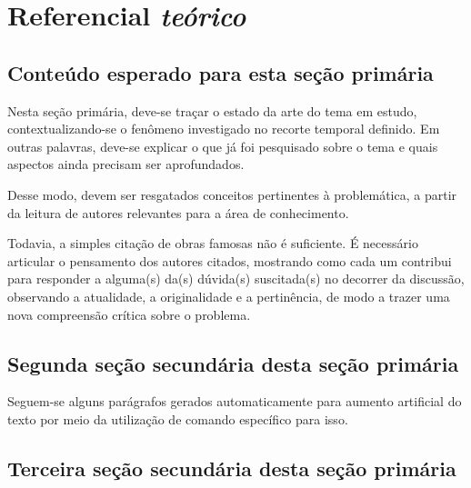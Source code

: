 \chapter{Referencial \normalfont \bfseries \itshape teórico}\label{sec-refteo} %
\section{Conteúdo esperado para esta seção primária}
Nesta seção primária, deve-se traçar o estado da arte do tema em estudo, contextualizando-se o fenômeno investigado no recorte temporal definido. Em outras palavras, deve-se explicar o que já foi pesquisado sobre o tema e quais aspectos ainda precisam ser aprofundados.

Desse modo, devem ser resgatados conceitos pertinentes à problemática, a partir da leitura de autores relevantes para a área de conhecimento.

Todavia, a simples citação de obras famosas não é suficiente. É necessário articular o pensamento dos autores citados, mostrando como cada um contribui para responder a alguma(s) da(s) dúvida(s) suscitada(s) no decorrer da discussão, observando a atualidade, a originalidade e a pertinência, de modo a trazer uma nova compreensão crítica sobre o problema.

\section{Segunda seção secundária desta seção primária}

Seguem-se alguns parágrafos gerados automaticamente para aumento artificial do texto por meio da utilização de comando específico para isso.

\lipsum[20-22]

\section{Terceira seção secundária desta seção primária}

